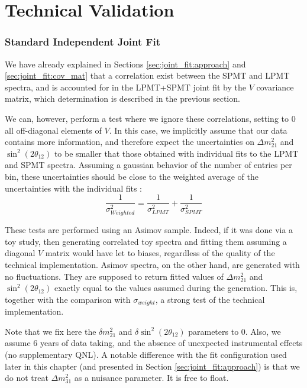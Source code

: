 \documentclass[../main.tex]{subfiles}
\begin{document}
\section{Technical Validation}
\label{sec:joint_fit:validation}

\subsubsection{Standard Independent Joint Fit}


We have already explained in Sections \ref{sec:joint_fit:approach} and \ref{sec:joint_fit:cov_mat} that a correlation exist between the SPMT and LPMT spectra, and is accounted for in the LPMT+SPMT joint fit by the $V$ covariance matrix, which determination is described in the previous section.

We can, however, perform a test where we ignore these correlations, setting to 0 all off-diagonal elements of $V$. In this case, we implicitly assume that our data contains more information, and therefore expect the uncertainties on $\Delta m^2_{21}$ and $\sin^2(2 \theta_{12})$ to be smaller that those obtained with individual fits to the LPMT and SPMT spectra. Assuming a gaussian behavior of the number of entries per bin, these uncertainties should be close to the weighted average of the uncertainties with the individual fits :
\begin{equation}
  \label{eq:joint_fit:weighted_average}
  \frac{1}{\sigma^2_{Weighted}} = \frac{1}{\sigma^2_{LPMT}} + \frac{1}{\sigma^2_{SPMT}}
\end{equation}

These tests are performed using an Asimov sample. Indeed, if it was done via a toy study, then generating correlated toy spectra and fitting them assuming a diagonal $V$ matrix would have let to biases, regardless of the quality of the technical implementation. Asimov spectra, on the other hand, are generated with no fluctuations. They are supposed to return fitted values of $\Delta m^2_{21}$ and $\sin^2(2 \theta_{12})$ exactly equal to the values assumed during the generation. This is, together with the comparison with $\sigma_{weight}$, a strong test of the technical implementation.

Note that we fix here the $\delta m^2_{21}$ and $\delta \sin^2(2 \theta_{12})$ parameters to 0. Also, we assume 6 years of data taking, and the absence of unexpected instrumental effects (no supplementary QNL). A notable difference with the fit configuration used later in this chapter (and presented in Section \ref{sec:joint_fit:approach}) is that we do not treat $\Delta m^2_{31}$ as a nuisance parameter. It is free to float.
\end{document}

